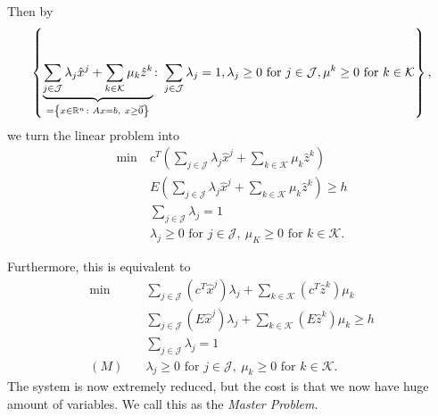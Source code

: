 Then by
\[
	\left\{\underbrace{\sum\limits_{j\in\mathcal{J}} \lambda_{j} \hat{x}^j + \sum\limits_{k\in\mathcal{K}}\mu_k \hat{z}^k}_{=\left\{x\in\mathbb{\MakeUppercase{R}}^n\colon Ax = b,\ x\geq \vec{0}\right\}}
	\colon \sum\limits_{j\in\mathcal{J}}\lambda_{j} = 1, \lambda_{j}\geq 0 \text{ for }j\in \mathcal{J}, \mu^k\geq 0\text{ for } k\in \mathcal{K}\right\},
\]
we turn the linear problem into
\begin{align*}
	\min~ & c^T\left(\sum\limits_{j\in\mathcal{J}}\lambda_{j}\hat{x}^j + \sum\limits_{k\in\mathcal{K}}\mu_k \hat{z}^k  \right)      \\
	      & E\left(\sum\limits_{j\in\mathcal{J}}\lambda_{j}\hat{x}^j + \sum\limits_{k\in\mathcal{K}}\mu_k \hat{z}^k  \right) \geq h \\
	      & \sum\limits_{j\in\mathcal{J}}\lambda_{j} = 1                                                                            \\
	      & \lambda_{j}\geq 0 \text{ for }j\in\mathcal{J},\ \mu_K\geq 0 \text{ for }k\in\mathcal{K}.
\end{align*}

Furthermore, this is equivalent to
\begin{align*}
	\min~    & \sum\limits_{j\in\mathcal{J}}\left(c^T\hat{x}^j\right)\lambda_{j} + \sum\limits_{k\in\mathcal{K}}\left(c^{T} \hat{z}^k  \right)\mu_k \\
	         & \sum\limits_{j\in\mathcal{J}}\left(E\hat{x}^j\right)\lambda_{j} + \sum\limits_{k\in\mathcal{K}}\left(E \hat{z}^k \right)\mu_k \geq h \\
	         & \sum\limits_{j\in\mathcal{J}}\lambda_{j} = 1                                                                                         \\
	(M)\quad & \lambda_{j}\geq 0 \text{ for }j\in\mathcal{J},\ \mu_k\geq 0 \text{ for }k\in\mathcal{K}.
\end{align*}
The system is now extremely reduced, but the cost is that we now have huge amount of variables. We call this as the \emph{Master Problem}.


